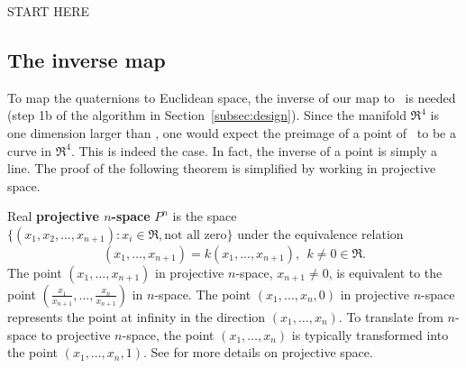 \documentclass[11pt]{article}
\begin{document}
START HERE

\subsection{The inverse map}

To map the quaternions to Euclidean space,
the inverse of our map to \ is needed (step 1b of the algorithm
in Section~\ref{subsec:design}).
Since the manifold $\Re^4$ is one dimension larger than , 
one would expect the preimage of a point of \ to be 
a curve in $\Re^4$.
This is indeed the case.
In fact, the inverse of a point is simply a line.
The proof of the following theorem is simplified by working in projective space.
%
\begin{defn2}
\label{defn:projspace}
Real {\bf projective $n$-space} $P^n$ is the space 
$\{ (x_1,x_2,\ldots,x_{n+1}) : x_i \in \Re, \mbox{not all zero} \}$
under the equivalence relation 
\begin{equation}
\label{eq:projequivalence}
(x_1,\ldots,x_{n+1}) = k(x_1,\ldots,x_{n+1}),\ \ k \neq 0 \in \Re.
\end{equation}
The point $(x_1,\ldots,x_{n+1})$ in projective $n$-space, $x_{n+1} \neq 0$,
is equivalent to the point $(\frac{x_1}{x_{n+1}},\ldots,\frac{x_n}{x_{n+1}})$
in $n$-space.
The point $(x_1,\ldots,x_n,0)$ in projective $n$-space represents the point
at infinity in the direction $(x_1,\ldots,x_n)$.
To translate from $n$-space to projective $n$-space, the point 
$(x_1,\ldots,x_n)$ is typically transformed into the point $(x_1,\ldots,x_n,1)$.
See \cite{harris92} for more details on projective space.
\end{defn2}
\end{document}
